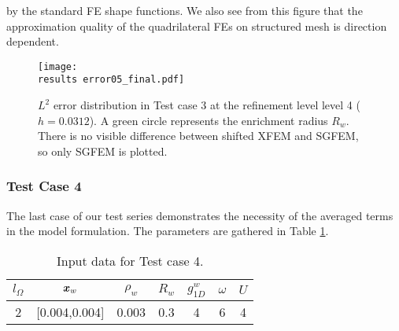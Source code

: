 by the standard FE shape functions. We also see from this figure that the approximation quality of the quadrilateral FEs on structured mesh is direction dependent.
%
\begin{figure}[!htb]
  \centering    
  \texttt{[image: \\results error05\_final.pdf]}
  \caption[Error distribution in Test case 3.]{$L^2$ error distribution in Test case 3 at the refinement level level 4 ($h=0.0312$).
  A green circle represents the enrichment radius $R_w$. There is no visible difference between shifted XFEM and SGFEM, so only SGFEM is plotted.}
  \label{fig:error_distribution_test3}
\end{figure}
%

\subsubsection{Test Case 4}
The last case of our test series demonstrates the necessity of the averaged terms in the model formulation.
The parameters are gathered in Table \ref{tab:test_case_4_data}.
%
\begin{table}[!htb]
\begin{center}
\begin{tabular}{ccccccc}
\toprule
$l_\Omega$ & $\mathbf{\boldsymbol{x}}_w$  & $\rho_w$ & $R_w$ & $g^w_{1D}$ & $\omega$ & $U$ \\
\midrule
2 & [0.004,0.004] & 0.003 & 0.3 & 4 & 6 & 4\\
\bottomrule
\end{tabular}
\caption{Input data for Test case 4.}
\label{tab:test_case_4_data}
\end{center}
\end{table}
%

